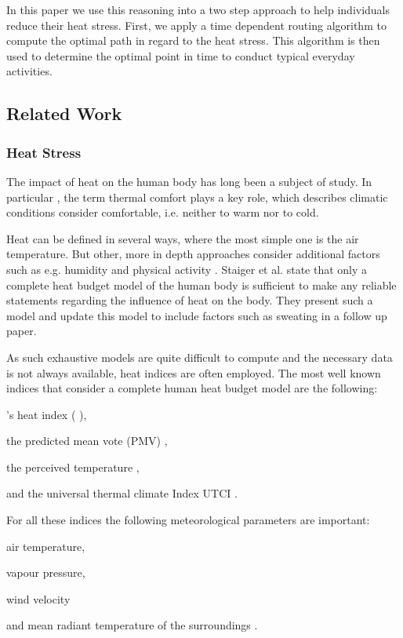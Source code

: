 In this paper we use this reasoning into a two step approach to help individuals reduce their heat stress. First, we apply a time dependent routing algorithm to compute the optimal path in regard to the heat stress. This algorithm is then used to determine the optimal point in time to conduct typical everyday activities. 



   
\subsection{Related Work} 

\subsubsection{Heat Stress}
The impact of heat on the human body has long been a subject of study. In particular , the term thermal comfort plays a key role, which describes climatic conditions consider comfortable, i.e. neither to warm nor to cold.

Heat can be defined in several ways, where the most simple one is the air temperature. But other, more in depth approaches consider additional factors such as e.g. humidity and physical activity \parencite{Staiger2011,Huebler2007}. Staiger et al.\parencite{Staiger1997} state that only a complete heat budget model of the human body is sufficient to make any reliable statements regarding the influence of heat on the body. They present such a model and update this model to include factors such as sweating in a follow up paper\parencite{Staiger2011}. 

As such exhaustive models are quite difficult to compute and the necessary data is not always available, heat indices are often employed. The most well known indices that consider a complete human heat budget model are the following:
\begin{inparaenum}[(1)]
  \item \citeauthor{Steadman1979}'s heat index (\citeauthor{Steadman1979} \citeyear*{Steadman1979}\citeyear*{Steadman1979a}),
  \item the predicted mean vote (PMV) \parencite{Fanger1973},
  \item the perceived temperature \parencite{Staiger1997,Jendritzky2000},
  \item and the universal thermal climate Index UTCI \parencite{Jendritzky2010}.
\end{inparaenum}

For all these indices the following meteorological parameters are important:
\begin{inparaenum}[(1)]
\item air temperature,
\item vapour pressure,
\item wind velocity 
\item and mean radiant temperature of the surroundings \parencite{Matzarakis1999}.
\end{inparaenum}

